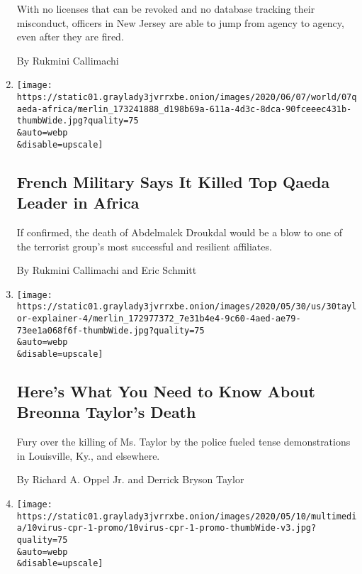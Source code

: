 \begin{enumerate}
  With no licenses that can be revoked and no database tracking their
  misconduct, officers in New Jersey are able to jump from agency to
  agency, even after they are fired.

  By Rukmini Callimachi
\item
  \href{/2020/06/06/world/africa/al-qaeda-abdelmalek-droukdal.html}{}

  \texttt{[image: https://static01.graylady3jvrrxbe.onion/images/2020/06/07/world/07qaeda-africa/merlin\_173241888\_d198b69a-611a-4d3c-8dca-90fceeec431b-thumbWide.jpg?quality=75\\\&auto=webp\\\&disable=upscale]}

  \hypertarget{french-military-says-it-killed-top-qaeda-leader-in-africa}{%
  \subsection{French Military Says It Killed Top Qaeda Leader in
  Africa}\label{french-military-says-it-killed-top-qaeda-leader-in-africa}}

  If confirmed, the death of Abdelmalek Droukdal would be a blow to one
  of the terrorist group's most successful and resilient affiliates.

  By Rukmini Callimachi and Eric Schmitt
\item
  \href{/article/breonna-taylor-police.html}{}

  \texttt{[image: https://static01.graylady3jvrrxbe.onion/images/2020/05/30/us/30taylor-explainer-4/merlin\_172977372\_7e31b4e4-9c60-4aed-ae79-73ee1a068f6f-thumbWide.jpg?quality=75\\\&auto=webp\\\&disable=upscale]}

  \hypertarget{heres-what-you-need-to-know-about-breonna-taylors-death}{%
  \subsection{Here's What You Need to Know About Breonna Taylor's
  Death}\label{heres-what-you-need-to-know-about-breonna-taylors-death}}

  Fury over the killing of Ms. Taylor by the police fueled tense
  demonstrations in Louisville, Ky., and elsewhere.

  By Richard A. Oppel Jr. and Derrick Bryson Taylor
\item
  \href{/2020/05/10/nyregion/paramedics-cpr-coronavirus.html}{}

  \texttt{[image: https://static01.graylady3jvrrxbe.onion/images/2020/05/10/multimedia/10virus-cpr-1-promo/10virus-cpr-1-promo-thumbWide-v3.jpg?quality=75\\\&auto=webp\\\&disable=upscale]}


\end{enumerate}
